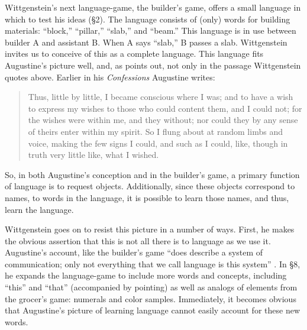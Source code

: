 \documentclass[man,12pt,natbib]{apa6}
\begin{document}
Wittgenstein's next language-game, the builder's game, offers a small language
in which to test 
%
%
his ideas (\S 2). The language consists of (only) words for
building materials: ``block,'' ``pillar,'' ``slab,'' and ``beam.'' This
language is in use between builder A and assistant B. When A says ``slab,'' B
passes a slab. Wittgenstein invites us to conceive of this as a complete
language. This language fits Augustine's picture well, and, as \citet{McGinn97}
points out, not only in the passage Wittgenstein quotes above. Earlier in his
\emph{Confessions} Augustine writes:
\begin{quote}
	Thus, little by little, I became conscious where I was; and to have a wish
	to express my wishes to those who could content them, and I could not; for
	the wishes were within me, and they without; nor could they by any sense of
	theirs enter within my spirit. So I flung about at random limbs and voice,
	making the few signs I could, and such as I could, like, though in truth
	very little like, what I wished. \citep[\S 1.6.8]{Pusey09}
\end{quote}
So, in both Augustine's conception and in the builder's game, a
primary function of language is to request objects. Additionally, since these
objects correspond to names, to words in the language, it is possible to learn
those names, and thus, learn the language.

Wittgenstein goes on to resist this picture in a number of ways. First, he
makes the obvious assertion that this is not all there is to language as we use
it. Augustine's account, like the builder's game ``does describe a system of
communication; only not everything that we call language is this system''
\citep[\S 3]{Wittgenstein53}. In \S 8, he expands the language-game to include
more words and concepts, including ``this'' and ``that'' (accompanied by
pointing) as well as analogs of elements from the grocer's game: numerals and
color samples. Immediately, it becomes obvious that Augustine's picture of
learning language cannot easily account for these new words.
\end{document}
